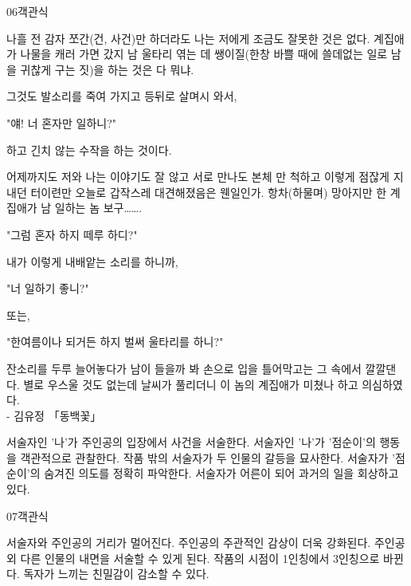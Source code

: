 \documentclass[fs9,seriesRus]{korfarm-base}
\begin{document}
\begin{kfQBlock}{06}{객관식}
\begin{kfEvidence}나흘 전 감자 쪼간(건, 사건)만 하더라도 나는 저에게 조금도 잘못한 것은 없다. 계집애가 나물을 캐러 가면 갔지 남 울타리 엮는 데 쌩이질(한창 바쁠 때에 쓸데없는 일로 남을 귀찮게 구는 짓)을 하는 것은 다 뭐냐.

그것도 발소리를 죽여 가지고 등뒤로 살며시 와서,

"얘! 너 혼자만 일하니?"

하고 긴치 않는 수작을 하는 것이다.

어제까지도 저와 나는 이야기도 잘 않고 서로 만나도 본체 만 척하고 이렇게 점잖게 지내던 터이련만 오늘로 갑작스레 대견해졌음은 웬일인가. 항차(하물며) 망아지만 한 계집애가 남 일하는 놈 보구…….

"그럼 혼자 하지 떼루 하디?"

내가 이렇게 내배앝는 소리를 하니까,

"너 일하기 좋니?"

또는,

"한여름이나 되거든 하지 벌써 울타리를 하니?"

잔소리를 두루 늘어놓다가 남이 들을까 봐 손으로 입을 틀어막고는 그 속에서 깔깔댄다. 별로 우스울 것도 없는데 날씨가 풀리더니 이 놈의 계집애가 미쳤나 하고 의심하였다.   \\\relax
- 김유정 「동백꽃」\end{kfEvidence}
\begin{kfChoices}
\kfChoice 서술자인 '나'가 주인공의 입장에서 사건을 서술한다.
\kfChoice 서술자인 '나'가 '점순이'의 행동을 객관적으로 관찰한다.
\kfChoice 작품 밖의 서술자가 두 인물의 갈등을 묘사한다.
\kfChoice 서술자가 '점순이'의 숨겨진 의도를 정확히 파악한다.
\kfChoice 서술자가 어른이 되어 과거의 일을 회상하고 있다.
\end{kfChoices}
\end{kfQBlock}
\begin{kfQBlock}{07}{객관식}
\begin{kfChoices}
\kfChoice 서술자와 주인공의 거리가 멀어진다.
\kfChoice 주인공의 주관적인 감상이 더욱 강화된다.
\kfChoice 주인공 외 다른 인물의 내면을 서술할 수 있게 된다.
\kfChoice 작품의 시점이 1인칭에서 3인칭으로 바뀐다.
\kfChoice 독자가 느끼는 친밀감이 감소할 수 있다.
\end{kfChoices}
\end{kfQBlock}
\end{document}

